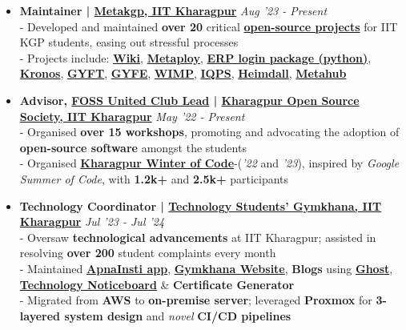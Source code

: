 \documentclass[a4paper,10pt]{extarticle} %
\begin{document}
\begin{itemize}[leftmargin=0.55cm, rightmargin=0.2cm, label={\Large\textbullet}]

\item \textbf{Maintainer | \href{https://metakgp.org/}{Metakgp, IIT Kharagpur}} \hfill{\textit{Aug '23 - Present}}\\
- Developed and maintained \textbf{over 20} critical \textbf{\href{https://github.com/metakgp}{open-source projects}} for IIT KGP students, easing out stressful processes \\
- Projects include: \href{https://wiki.metakgp.org}{\textbf{Wiki}}, \href{https://github.com/metakgp/metaploy}{\textbf{Metaploy}}, \href{https://pypi.org/project/iitkgp-erp-login/}{\textbf{ERP login package (python)}}, \href{http://kronos.streamlit.app}{\textbf{Kronos}}, \href{https://gyft.metakgp.org}{\textbf{GYFT}}, \href{https://gyfe.metakgp.org}{\textbf{GYFE}}, \href{https://github.com/metakgp/wimp}{\textbf{WIMP}}, \href{https://qp.metakgp.org}{\textbf{IQPS}}, \href{https://heimdall.metakgp.org}{\textbf{Heimdall}}, \href{https://github.com/proffapt/Metahub}{\textbf{Metahub}}

\item \textbf{Advisor, \href{https://fossunited.org/clubs}{\textbf{FOSS United Club Lead}} | \href{https://kossiitkgp.org}{Kharagpur Open Source Society, IIT Kharagpur}} \hfill{\textit{May '22 - Present}}\\
- Organised \textbf{over 15 workshops}, promoting and advocating the adoption of \textbf{open-source software} amongst the students \\
- Organised \textbf{\href{https://kwoc.kossiitkgp.org/}{Kharagpur Winter of Code}}-(\textit{'22} and \textit{'23}), inspired by \textit{Google Summer of Code}, with \textbf{1.2k+} and \textbf{2.5k+} participants

\item \textbf{Technology Coordinator | \href{https://gymkhana.iitkgp.ac.in/}{Technology Students' Gymkhana, IIT Kharagpur}} \hfill{\textit{Jul '23 - Jul '24}}\\
- Oversaw \textbf{technological advancements} at IIT Kharagpur;  assisted in resolving \textbf{over 200} student complaints every month \\
- Maintained \href{https://play.google.com/store/apps/details?id=com.apnainsti&pli=1}{\textbf{ApnaInsti app}}, \href{https://gymkhana.iitkgp.ac.in/}{\textbf{Gymkhana Website}}, \textbf{Blogs} using \href{https://ghost.org/}{\textbf{Ghost}}, \href{https://github.com/tsg-iitkgp/noticeboard}{\textbf{Technology Noticeboard}} \& \textbf{Certificate Generator} \\
- Migrated from \textbf{AWS} to \textbf{on-premise server}; leveraged \textbf{Proxmox} for \textbf{3-layered system design} and \textit{novel} \textbf{CI/CD pipelines}

\end{itemize}
\end{document}
